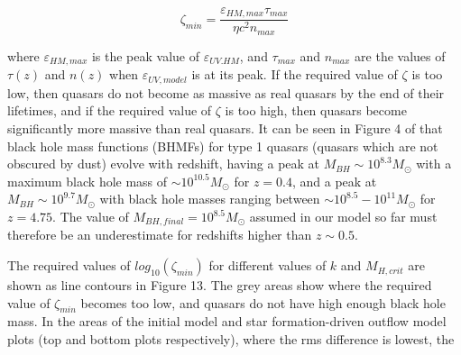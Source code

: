 \documentclass[12pt, twocolumn]{article}%
\begin{document}
\begin{equation}
    \zeta_{min}=\frac{\varepsilon_{HM,max}\tau_{max}}{\eta c^2n_{max}}
\end{equation}

\noindent where $\varepsilon_{HM,max}$ is the peak value of $\varepsilon_{UV.HM}$, and $\tau_{max}$ and $n_{max}$ are the values of $\tau(z)$ and $n(z)$ when $\varepsilon_{UV,model}$ is at its peak. If the required value of $\zeta$ is too low, then quasars do not become as massive as real quasars by the end of their lifetimes, and if the required value of $\zeta$ is too high, then quasars become significantly more massive than real quasars. It can be seen in Figure 4 of \cite{BH_mass_fns} that black hole mass functions (BHMFs) for type 1 quasars (quasars which are not obscured by dust) evolve with redshift, having a peak at $M_{BH}\sim10^{8.3}M_\odot$ with a maximum black hole mass of $\sim10^{10.5}M_\odot$ for $z=0.4$, and a peak at $M_{BH}\sim10^{9.7}M_\odot$ with black hole masses ranging between $\sim10^{8.5}-10^{11}M_\odot$ for $z=4.75$. The value of $M_{BH,final}=10^{8.5}M_\odot$ assumed in our model so far must therefore be an underestimate for redshifts higher than $z\sim0.5$.\par

The required values of $log_{10}(\zeta_{min})$ for different values of $k$ and $M_{H,crit}$ are shown as line contours in Figure 13. The grey areas show where the required value of $\zeta_{min}$ becomes too low, and quasars do not have high enough black hole mass. In the areas of the initial model and star formation-driven outflow model plots (top and bottom plots respectively), where the rms difference is lowest, the

\newpage

\onecolumngrid
\end{document}
